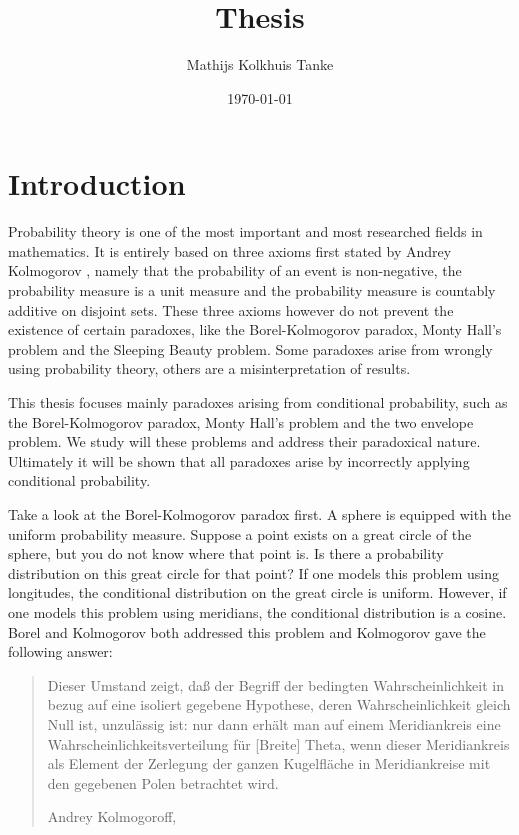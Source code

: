 \documentclass[twoside,a4paper]{report}
\title{Thesis}
\author{Mathijs Kolkhuis Tanke}
\date{\today}
\theoremstyle{plain}
\theoremstyle{definition}
\theoremstyle{remark}
\numberwithin{equation}{chapter}
\DeclareMathOperator{\1}{\mathbbm{1}}
\begin{document}
\begin{titlepage}
\maketitle
\end{titlepage}

\begin{abstract}

\end{abstract}

\tableofcontents

\newpage

\chapter{Introduction}
Probability theory is one of the most important and most researched fields in mathematics. It is entirely based on three axioms first stated by Andrey Kolmogorov \cite{Kolmogorov33}, namely that the probability of an event is non-negative, the probability measure is a unit measure and the probability measure is countably additive on disjoint sets. These three axioms however do not prevent the existence of certain paradoxes, like the Borel-Kolmogorov paradox, Monty Hall's problem and the Sleeping Beauty problem. Some paradoxes arise from wrongly using probability theory, others are a misinterpretation of results.

This thesis focuses mainly paradoxes arising from conditional probability, such as the Borel-Kolmogorov paradox, Monty Hall's problem and the two envelope problem. We study will these problems and address their paradoxical nature. Ultimately it will be shown that all paradoxes arise by incorrectly applying conditional probability.

Take a look at the Borel-Kolmogorov paradox first. A sphere is equipped with the uniform probability measure. Suppose a point exists on a great circle of the sphere, but you do not know where that point is. Is there a probability distribution on this great circle for that point? If one models this problem using longitudes, the conditional distribution on the great circle is uniform. However, if one models this problem using meridians, the conditional distribution is a cosine. Borel \cite{Borel09} and Kolmogorov \cite{Kolmogorov33} both addressed this problem and Kolmogorov gave the following answer:

\foreignblockquote{ngerman}[Andrey Kolmogoroff, \cite{Kolmogorov33}]{Dieser Umstand zeigt, daß der Begriff der bedingten Wahrscheinlichkeit in bezug auf eine isoliert gegebene Hypothese, deren Wahrscheinlichkeit gleich Null ist, unzulässig ist: nur dann erhält man auf einem Meridiankreis eine Wahrscheinlichkeitsverteilung für [Breite] Theta, wenn dieser Meridiankreis als Element der Zerlegung der ganzen Kugelfläche in Meridiankreise mit den gegebenen Polen betrachtet wird.}
\end{document}
